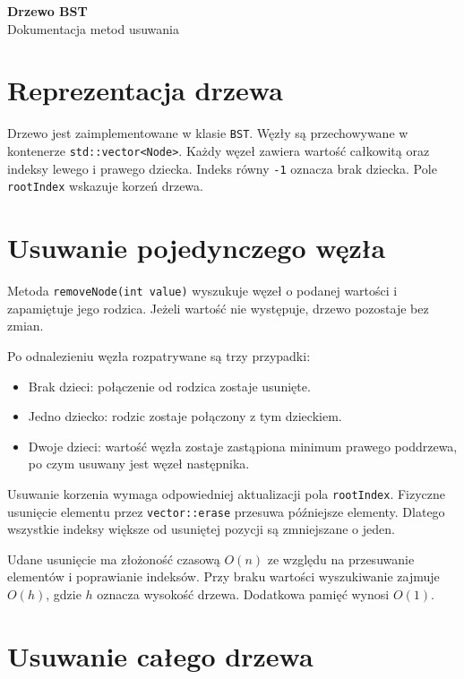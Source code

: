 \documentclass[11pt,a4paper]{article}
\begin{document}
\begin{center}
    {\Large\textbf{Drzewo BST}}\\[4pt]
    Dokumentacja metod usuwania
\end{center}

\section{Reprezentacja drzewa}

Drzewo jest zaimplementowane w klasie \texttt{BST}.
Węzły są przechowywane w kontenerze \texttt{std::vector<Node>}.
Każdy węzeł zawiera wartość całkowitą oraz indeksy lewego
i prawego dziecka. Indeks równy \texttt{-1} oznacza brak dziecka.
Pole \texttt{rootIndex} wskazuje korzeń drzewa.

\section{Usuwanie pojedynczego węzła}

Metoda \texttt{removeNode(int value)} wyszukuje węzeł
o podanej wartości i zapamiętuje jego rodzica.
Jeżeli wartość nie występuje, drzewo pozostaje bez zmian.

Po odnalezieniu węzła rozpatrywane są trzy przypadki:
\begin{itemize}
    \item Brak dzieci: połączenie od rodzica zostaje usunięte.
    \item Jedno dziecko: rodzic zostaje połączony z tym dzieckiem.
    \item Dwoje dzieci: wartość węzła zostaje zastąpiona minimum
    prawego poddrzewa, po czym usuwany jest węzeł następnika.
\end{itemize}

Usuwanie korzenia wymaga odpowiedniej aktualizacji
pola \texttt{rootIndex}. Fizyczne usunięcie elementu
przez \texttt{vector::erase} przesuwa późniejsze elementy.
Dlatego wszystkie indeksy większe od usuniętej pozycji
są zmniejszane o jeden.

Udane usunięcie ma złożoność czasową $O(n)$ ze względu
na przesuwanie elementów i poprawianie indeksów.
Przy braku wartości wyszukiwanie zajmuje $O(h)$,
gdzie $h$ oznacza wysokość drzewa.
Dodatkowa pamięć wynosi $O(1)$.

\section{Usuwanie całego drzewa}
\end{document}
